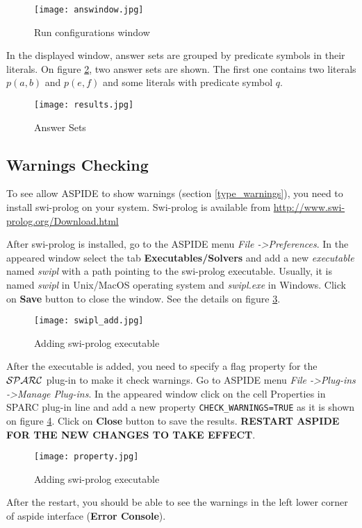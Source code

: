 \documentclass[12pt, letterpaper]{article}
\begin{document}
\begin{figure}[ht]
\centering
\texttt{[image: answindow.jpg]}
\caption{Run configurations window}
\label{fig:ansset}
\end{figure}
\pagebreak

In the displayed window, answer sets are grouped by predicate symbols in their literals.
On figure \ref{fig:ansres}, two answer sets are shown. The first one  contains two literals $p(a,b)$ and $p(e,f)$ and some literals with predicate symbol $q$.  
\begin{figure}[ht]
\centering
\texttt{[image: results.jpg]}
\caption{Answer Sets}
\label{fig:ansres}
\end{figure}



 
\subsection{Warnings Checking}

To see allow ASPIDE to show warnings (section \ref{type_warnings}), you need to install swi-prolog on your system. Swi-prolog is available from  {\scriptsize
\url{http://www.swi-prolog.org/Download.html}
} 

After swi-prolog is installed, go to the ASPIDE menu \textit{File -\textgreater Preferences}. In the appeared window select the tab \textbf{Executables/Solvers} and add a new \textit{executable} named \textit{swipl} with a path pointing to the swi-prolog executable. Usually, it is named \textit{swipl} in Unix/MacOS operating system and \textit {swipl.exe} in Windows. Click on \textbf{Save} button to close the window.
See the details on figure \ref{fig:addswipl}.
\begin{figure}[ht]
\centering
\texttt{[image: swipl\_add.jpg]}
\caption{Adding swi-prolog executable}
\label{fig:addswipl}
\end{figure}
\pagebreak
After the executable is added, you need to specify a flag property for the ${\cal SPARC}$ plug-in to make it check warnings.
Go to ASPIDE menu \textit{File -\textgreater Plug-ins -\textgreater  Manage Plug-ins}. In the appeared window click on the cell Properties in SPARC plug-in line and add a new property \texttt{CHECK\_WARNINGS=TRUE} as it is shown on figure \ref{fig:addprop}.
Click on \textbf{Close} button to save the results.
\textbf{RESTART ASPIDE FOR THE NEW CHANGES TO TAKE EFFECT}. 

\begin{figure}[ht]
\centering
\texttt{[image: property.jpg]}
\caption{Adding swi-prolog executable}
\label{fig:addprop}
\end{figure}
\pagebreak
After the restart, you should be able to see the warnings in the  left lower corner of aspide interface (\textbf{Error Console}). 



\end{document}
